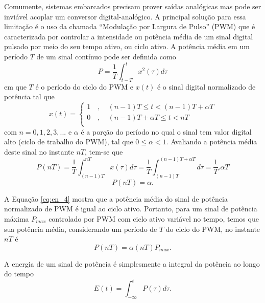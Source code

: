 Comumente, sistemas embarcados precisam prover saídas analógicas mas pode ser inviável acoplar um conversor digital-analógico. A principal solução para essa limitação é o uso da chamada ``Modulação por Largura de Pulso'' (PWM) que é caracterizada por controlar a intensidade ou potência média de um sinal digital pulsado por meio do seu tempo ativo, ou ciclo ativo. A potência média em um período $T$ de um sinal contínuo pode ser definida como
\begin{equation}
\label{eq:en_1}
P = \frac{1}{T} \int_{t-T}^t x^2(\tau)d\tau
\end{equation}
em que $T$ é o período do ciclo do PWM e $x(t)$ é o sinal digital normalizado de potência tal que
\begin{equation}
    \label{eq:en_2}
    x(t) =  \left\{
            \begin{array}{ll}
                1 \quad , \quad (n-1)T \leq t < (n-1)T+\alpha T \\ %
                0 \quad , \quad (n-1)T+\alpha T \leq t < n T\\
            \end{array}
            \right.
\end{equation}
 com $n = 0, 1, 2, 3, ...$ e $\alpha$ é a porção do período no qual o sinal tem valor digital alto (ciclo de trabalho do PWM), tal que $0 \leq \alpha < 1$. Avaliando a potência média deste sinal no instante $nT$, tem-se que 
\begin{equation}
    \label{eq:en_3}
    P(nT) = \frac{1}{T} \int_{(n-1)T}^{nT}x(\tau)d\tau = \frac{1}{T} \int_{(n-1)T}^{(n-1)T+\alpha T}d\tau = \frac{1}{T}.\alpha T
\end{equation}
\begin{equation}
    \label{eq:en_4}
    P(nT) = \alpha.
\end{equation}

A Equação \eqref{eq:en_4} mostra que a potência média do sinal de potência normalizado de PWM é igual ao ciclo ativo. Portanto, para um sinal de potência máxima $P_{max}$ controlado por PWM com ciclo ativo variável no tempo, temos que sua potência média, considerando um período de $T$ do ciclo do PWM, no instante $nT$ é
\begin{equation}
    \label{eq:en_5}
    P(nT) = \alpha(nT)P_{max}.
\end{equation}

A energia de um sinal de potência é simplesmente a integral da potência ao longo do tempo
\begin{equation}
    \label{eq:en_6}
    E(t) = \int_{-\infty}^{t}P(\tau)d\tau.
\end{equation}

